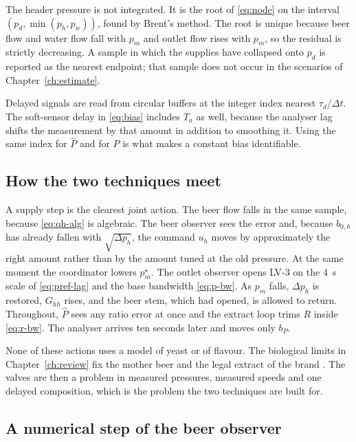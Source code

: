 The header pressure is not integrated. It is the root of \eqref{eq:node} on the interval $(p_d, \min(p_h,p_w))$, found by Brent's method. The root is unique because beer flow and water flow fall with $p_m$ and outlet flow rises with $p_m$, so the residual is strictly decreasing. A sample in which the supplies have collapsed onto $p_d$ is reported as the nearest endpoint; that sample does not occur in the scenarios of Chapter~\ref{ch:estimate}.

Delayed signals are read from circular buffers at the integer index nearest $\tau_d/\Delta t$. The soft-sensor delay in \eqref{eq:bias} includes $T_a$ as well, because the analyser lag shifts the measurement by that amount in addition to smoothing it. Using the same index for $\hat{P}$ and for $P$ is what makes a constant bias identifiable.

\subsection{How the two techniques meet}

A supply step is the clearest joint action. The beer flow falls in the same sample, because \eqref{eq:qh-alg} is algebraic. The beer observer sees the error and, because $b_{0,h}$ has already fallen with $\sqrt{\Delta p_h}$, the command $u_h$ moves by approximately the right amount rather than by the amount tuned at the old pressure. At the same moment the coordinator lowers $p_m^\star$. The outlet observer opens LV-3 on the \SI{4}{s} scale of \eqref{eq:pref-lag} and the base bandwidth \eqref{eq:p-bw}. As $p_m$ falls, $\Delta p_h$ is restored, $G_{hh}$ rises, and the beer stem, which had opened, is allowed to return. Throughout, $\hat{P}$ sees any ratio error at once and the extract loop trims $R$ inside \eqref{eq:r-bw}. The analyser arrives ten seconds later and moves only $b_P$.

None of these actions uses a model of yeast or of flavour. The biological limits in Chapter~\ref{ch:review} fix the mother beer and the legal extract of the brand \cite{stewart2010highgravity,boulton2001yeast,casey1984highgravity}. The valves are then a problem in measured pressures, measured speeds and one delayed composition, which is the problem the two techniques are built for.

\subsection{A numerical step of the beer observer}

